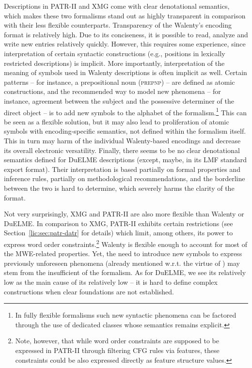 \documentclass[output=paper
,modfonts
,nonflat
,biblatexbackend=biber
]{langsci/langscibook}
\begin{document}
Descriptions in PATR-II and XMG come with clear denotational semantics, which makes these two formalisms stand out as highly transparent in comparison with their less flexible counterparts. Transparency of the Walenty's encoding format is relatively high. Due to its conciseness, it is possible to read, analyze and write new entries relatively quickly. However, this requires some experience, since interpretation of certain syntactic constructions (e.g., positions in lexically restricted  descriptions) is implicit. More importantly, interpretation of the meaning of symbols used in Walenty descriptions is often implicit as well. Certain patterns -- for instance, a prepositional noun  (\textsc{prepnp}) -- are defined as atomic constructions, and the recommended way to model new phenomena -- for instance, agreement between the subject and the possessive determiner of the direct object -- is to add new symbols to the alphabet of the formalism.\footnote{In fully flexible formalisms such new syntactic phenomena can be factored through the use of dedicated classes whose semantics remains explicit.} This can be seen as a flexible solution, but it may also lead to proliferation of atomic symbols with encoding-specific semantics, not defined within the formalism itself. This in turn may harm  of the individual Walenty-based encodings and decrease its overall electronic versatility. Finally, there seems to be no clear denotational semantics defined for DuELME descriptions (except, maybe, in its LMF standard export format). Their interpretation is based partially on formal properties and inference rules, partially on methodological recommendations, and the borderline between the two is hard to determine, which severely harms the clarity of the format. 

Not very surprisingly, XMG and PATR-II are also more flexible than Walenty or DuELME. In comparison to XMG, PATR-II exhibits certain restrictions (see Section~\ref{lic:sec:patr-datr} for details) which limit, among others, its power to express word order constraints.\footnote{Note, however, that while word order constraints are supposed to be expressed in PATR-II through filtering CFG rules via features, these constraints could be also expressed directly as feature structure values.} Walenty is flexible enough to account for most of the MWE-related properties. Yet, the need to introduce new symbols to express previously unforeseen phenomena (already mentioned w.r.t. the virtue of ) may stem from the insufficient  of the formalism. As for DuELME, we see its relatively low  as the main cause of its relatively low  -- it is hard to define complex constructions when clear foundations are not established.
\end{document}
